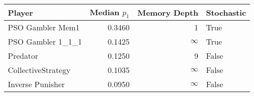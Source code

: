 \begin{tabular}{lrrl}
\toprule
             Player &  Median $p_1$ &  Memory Depth & Stochastic \\
\midrule
   PSO Gambler Mem1 &        0.3460 &             1 &       True \\
  PSO Gambler 1_1_1 &        0.1425 &            \(\infty\) &       True \\
           Predator &        0.1250 &             9 &      False \\
 CollectiveStrategy &        0.1035 &            \(\infty\) &      False \\
   Inverse Punisher &        0.0950 &            \(\infty\) &      False \\
\bottomrule
\end{tabular}
